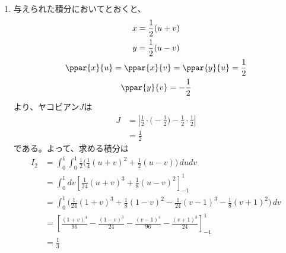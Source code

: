 \begin{ans*}
\begin{enumerate}[label=(\alph*)]
    \item 与えられた積分においてとおくと、
    \begin{gather}
      x = \frac{1}{2}(u+v) \\
      y = \frac{1}{2}(u-v) \\
      \ppar{x}{u} = \ppar{x}{v} = \ppar{y}{u} = \frac{1}{2} \\
      \ppar{y}{v} = -\frac{1}{2}
    \end{gather}
    より、ヤコビアン$J$は
    \begin{align}
      J
      &= \left|\frac{1}{2}\cdot\biggl(-\frac{1}{2}\biggr) - \frac{1}{2}\cdot\frac{1}{2}\right| \\
      &= \frac{1}{2}
    \end{align}
    である。よって、求める積分は
    \begin{align}
      I_2
      &= \int_{0}^{1}\int_{0}^{1}\frac{1}{2} \biggl(
        \frac{1}{4}(u+v)^2 + \frac{1}{2}(u-v)
      \biggr)\,dudv\\
      &= \int_{0}^{1}dv\left[\frac{1}{24}(u+v)^3 + \frac{1}{8}(u-v)^2\right]_{-1}^{1} \\
      &= \int_{0}^{1}
        \biggl(\frac{1}{24}(1+v)^3 + \frac{1}{8}(1-v)^2 - \frac{1}{24}(v-1)^3 - \frac{1}{8}(v+1)^2\biggr)
      \,dv \\
      &= \left[\frac{(1+v)^4}{96} - \frac{(1-v)^3}{24} - \frac{(v-1)^4}{96} - \frac{(v+1)^3}{24}\right]_{-1}^{1} \\
      &= \frac{1}{3}
    \end{align}
  \end{enumerate}
\end{ans*}


\newpage
